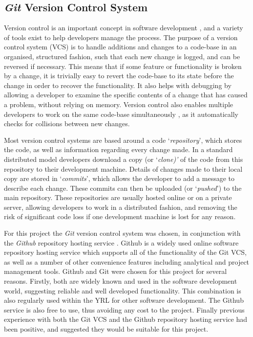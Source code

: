 \subsection{\textit{Git} Version Control System}
Version control is an important concept in software development \cite{VersionControl}, and a variety of tools exist to help developers manage the process. The purpose of a version control system (VCS) is to handle additions and changes to a code-base in an organised, structured fashion, such that each new change is logged, and can be reversed if necessary. This means that if some feature or functionality is broken by a change, it is trivially easy to revert the code-base to its state before the change in order to recover the functionality. It also helps with debugging by allowing a developer to examine the specific contents of a change that has caused a problem, without relying on memory. Version control also enables multiple developers to work on the same code-base simultaneously \cite{SVCPatent}, as it automatically checks for collisions between new changes.

Most version control systems are based around a code `\textit{repository}', which stores the code, as well as information regarding every change made. In a standard distributed model developers download a copy (or `\textit{clone)'} of the code from this repository to their development machine. Details of changes made to their local copy are stored in `\textit{commits}', which allows the developer to add a message to describe each change. These commits can then be uploaded (or `\textit{pushed}') to the main repository. These repositories are usually hosted online or on a private server, allowing developers to work in a distributed fashion, and removing the risk of significant code loss if one development machine is lost for any reason.

For this project the \textit{Git} version control system \cite{ProGit} was chosen, in conjunction with the \textit{Github} repository hosting service \cite{Github}. Github is a widely used online software repository hosting service which supports all of the functionality of the Git VCS, as well as a number of other convenience features including analytical and project management tools. Github and Git were chosen for this project for several reasons. Firstly, both are widely known and used in the software development world, suggesting reliable and well developed functionality. This combination is also regularly used within the YRL for other software development. The Github service is also free to use, thus avoiding any cost to the project. Finally previous experience with both the Git VCS and the Github repository hosting service had been positive, and suggested they would be suitable for this project.

